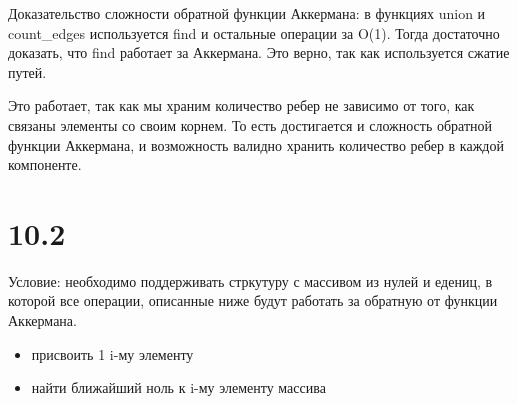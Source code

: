 \documentclass[12pt]{article}
\begin{document}
Доказательство сложности обратной функции Аккермана: в функциях union и count\_edges используется find и остальные операции за O(1). Тогда достаточно доказать, что find работает за Аккермана. Это верно, так как используется сжатие путей.

Это работает, так как мы храним количество ребер не зависимо от того, как связаны элементы со своим корнем. То есть достигается и сложность обратной функции Аккермана, и возможность валидно хранить количество ребер в каждой компоненте.

\section{10.2}
Условие: необходимо поддерживать стркутуру с массивом из нулей и едениц, в которой все операции, описанные ниже будут работать за обратную от функции Аккермана.
\begin{itemize}
    \item присвоить 1 i-му элементу
    \item найти ближайший ноль к i-му элементу массива
\end{itemize}
\end{document}

